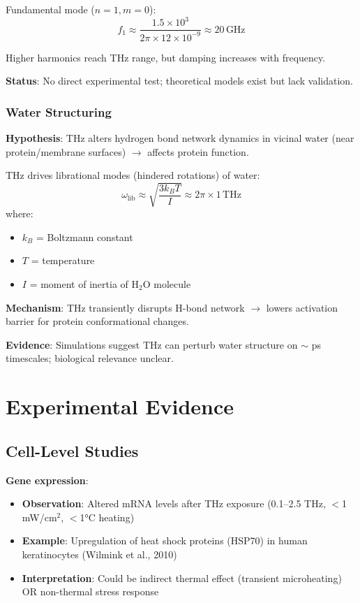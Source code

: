 Fundamental mode ($n=1, m=0$):
\begin{equation}
f_1 \approx \frac{1.5 \times 10^3}{2\pi \times 12 \times 10^{-9}} \approx 20\,\text{GHz}
\end{equation}

Higher harmonics reach THz range, but damping increases with frequency.

\textbf{Status}: No direct experimental test; theoretical models exist but lack validation.

\subsubsection{Water Structuring}

\textbf{Hypothesis}: THz alters hydrogen bond network dynamics in vicinal water (near protein/membrane surfaces) $\rightarrow$ affects protein function.

THz drives librational modes (hindered rotations) of water:
\begin{equation}
\omega_{\text{lib}} \approx \sqrt{\frac{3k_BT}{I}} \approx 2\pi \times 1\,\text{THz}
\end{equation}
where:
\begin{itemize}
\item $k_B$ = Boltzmann constant
\item $T$ = temperature
\item $I$ = moment of inertia of H$_2$O molecule
\end{itemize}

\textbf{Mechanism}: THz transiently disrupts H-bond network $\rightarrow$ lowers activation barrier for protein conformational changes.

\textbf{Evidence}: Simulations suggest THz can perturb water structure on $\sim$ ps timescales; biological relevance unclear.

\section{Experimental Evidence}

\subsection{Cell-Level Studies}

\textbf{Gene expression}:
\begin{itemize}
\item \textbf{Observation}: Altered mRNA levels after THz exposure (0.1--2.5 THz, $<$1 mW/cm$^2$, $<$1°C heating)
\item \textbf{Example}: Upregulation of heat shock proteins (HSP70) in human keratinocytes (Wilmink et al., 2010)
\item \textbf{Interpretation}: Could be indirect thermal effect (transient microheating) OR non-thermal stress response
\end{itemize}

